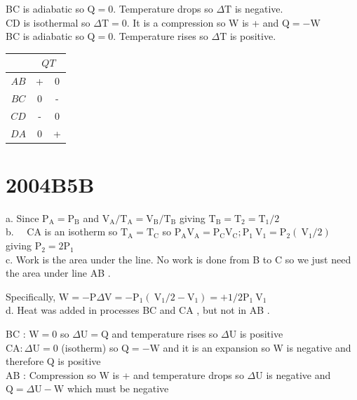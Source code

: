 \begin{enumerate}
BC is adiabatic so $\mathrm{Q}=0$. Temperature drops so $\Delta \mathrm{T}$ is negative.\\
CD is isothermal so $\Delta \mathrm{T}=0$. It is a compression so W is + and $\mathrm{Q}=-\mathrm{W}$\\
BC is adiabatic so $\mathrm{Q}=0$. Temperature rises so $\Delta \mathrm{T}$ is positive.

\begin{center}
\begin{tabular}{c|c|c|}
 & \multicolumn{2}{c}{$Q T$} \\
\hline
$A B$ & + & 0 \\
\hline
$B C$ & 0 & - \\
\hline
$C D$ & - & 0 \\
\hline
$D A$ & 0 & + \\
\hline
\end{tabular}
\end{center}

\section*{2004B5B}
a. Since $\mathrm{P}_{\mathrm{A}}=\mathrm{P}_{\mathrm{B}}$ and $\mathrm{V}_{\mathrm{A}} / \mathrm{T}_{\mathrm{A}}=\mathrm{V}_{\mathrm{B}} / \mathrm{T}_{\mathrm{B}}$ giving $\mathrm{T}_{\mathrm{B}}=\mathrm{T}_{2}=\mathrm{T}_{1} / 2$\\
b. $\quad \mathrm{CA}$ is an isotherm so $\mathrm{T}_{\mathrm{A}}=\mathrm{T}_{\mathrm{C}}$ so $\mathrm{P}_{\mathrm{A}} \mathrm{V}_{\mathrm{A}}=\mathrm{P}_{\mathrm{C}} \mathrm{V}_{\mathrm{C}} ; \mathrm{P}_{1} \mathrm{~V}_{1}=\mathrm{P}_{2}\left(\mathrm{~V}_{1} / 2\right)$ giving $\mathrm{P}_{2}=2 \mathrm{P}_{1}$\\
c. Work is the area under the line. No work is done from B to C so we just need the area under line AB .

Specifically, $\mathrm{W}=-\mathrm{P} \Delta \mathrm{V}=-\mathrm{P}_{1}\left(\mathrm{~V}_{1} / 2-\mathrm{V}_{1}\right)=+1 / 2 \mathrm{P}_{1} \mathrm{~V}_{1}$\\
d. Heat was added in processes BC and CA , but not in AB .

BC : $\mathrm{W}=0$ so $\Delta \mathrm{U}=\mathrm{Q}$ and temperature rises so $\Delta \mathrm{U}$ is positive\\
$\mathrm{CA}: \Delta \mathrm{U}=0$ (isotherm) so $\mathrm{Q}=-\mathrm{W}$ and it is an expansion so W is negative and therefore Q is positive\\
AB : Compression so W is + and temperature drops so $\Delta \mathrm{U}$ is negative and $\mathrm{Q}=\Delta \mathrm{U}-\mathrm{W}$ which must be negative


\end{enumerate}
